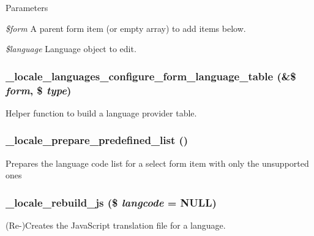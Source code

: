 \begin{DoxyParams}{Parameters}
\item[{\em \$form}]A parent form item (or empty array) to add items below. \item[{\em \$language}]Language object to edit. \end{DoxyParams}
\hypertarget{group__locale_ga3aeae5dacd89af2116019f5964787c48}{
\subsubsection[{\_\-locale\_\-languages\_\-configure\_\-form\_\-language\_\-table}]{\setlength{\rightskip}{0pt plus 5cm}\_\-locale\_\-languages\_\-configure\_\-form\_\-language\_\-table (\&\$ {\em form}, \/  \$ {\em type})}}
\label{group__locale_ga3aeae5dacd89af2116019f5964787c48}
Helper function to build a language provider table. \hypertarget{group__locale_gadf3279a1c940efe6955edc1899a97aad}{
\subsubsection[{\_\-locale\_\-prepare\_\-predefined\_\-list}]{\setlength{\rightskip}{0pt plus 5cm}\_\-locale\_\-prepare\_\-predefined\_\-list ()}}
\label{group__locale_gadf3279a1c940efe6955edc1899a97aad}
Prepares the language code list for a select form item with only the unsupported ones \hypertarget{group__locale_ga1235873f9a64b606895cd77628bffabc}{
\subsubsection[{\_\-locale\_\-rebuild\_\-js}]{\setlength{\rightskip}{0pt plus 5cm}\_\-locale\_\-rebuild\_\-js (\$ {\em langcode} = {\ttfamily NULL})}}
\label{group__locale_ga1235873f9a64b606895cd77628bffabc}
(Re-\/)Creates the JavaScript translation file for a language.


